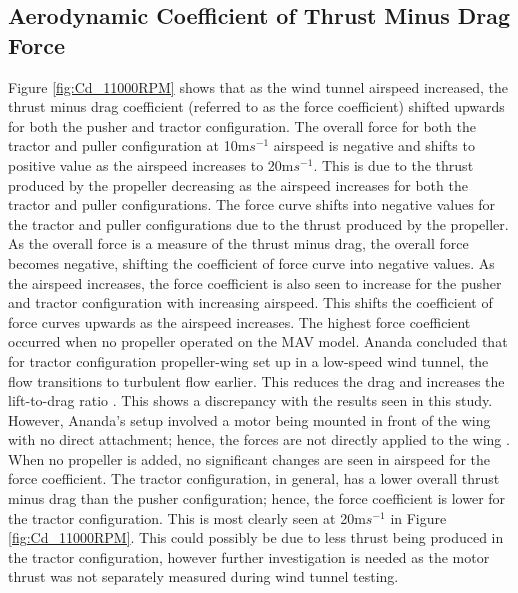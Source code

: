 \subsection{Aerodynamic Coefficient of Thrust Minus Drag Force}
Figure \ref{fig:Cd_11000RPM} shows that as the wind tunnel airspeed increased, the thrust minus drag coefficient (referred to as the force coefficient) shifted upwards for both the pusher and tractor configuration. The overall force for both the tractor and puller configuration at 10m$s^{-1}$ airspeed is negative and shifts to positive value as the airspeed increases to 20m$s^{-1}$. This is due to the thrust produced by the propeller decreasing as the airspeed increases for both the tractor and puller configurations. The force curve shifts into negative values for the tractor and puller configurations due to the thrust produced by the propeller. As the overall force is a measure of the thrust minus drag, the overall force becomes negative, shifting the coefficient of force curve into negative values. As the airspeed increases, the force coefficient is also seen to increase for the pusher and tractor configuration with increasing airspeed. This shifts the coefficient of force curves upwards as the airspeed increases. The highest force coefficient occurred when no propeller operated on the \acrshort{MAV} model. Ananda concluded that for tractor configuration propeller-wing set up in a low-speed wind tunnel, the flow transitions to turbulent flow earlier. This reduces the drag and increases the lift-to-drag ratio \cite{Ananda2018}. This shows a discrepancy with the results seen in this study. However, Ananda's setup involved a motor being mounted in front of the wing with no direct attachment; hence, the forces are not directly applied to the wing \cite{Ananda2018}. When no propeller is added, no significant changes are seen in airspeed for the force coefficient. The tractor configuration, in general, has a lower overall thrust minus drag than the pusher configuration; hence, the force coefficient is lower for the tractor configuration. This is most clearly seen at 20m$s^{-1}$ in Figure \ref{fig:Cd_11000RPM}. This could possibly be due to less thrust being produced in the tractor configuration, however further investigation is needed as the motor thrust was not separately measured during wind tunnel testing. 




